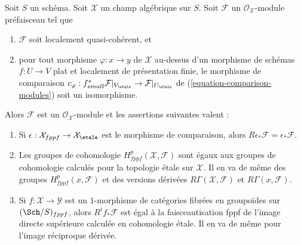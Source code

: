 \begin{lemma}
\label{lemma-compare-fppf-etale}
Soit $S$ un schéma. Soit $\mathcal{X}$ un champ algébrique sur $S$.
Soit $\mathcal{F}$ un $\mathcal{O}_\mathcal{X}$-module préfaisceau tel que
\begin{enumerate}
\item[(a)] $\mathcal{F}$ soit localement quasi-cohérent, et
\item[(b)] pour tout morphisme $\varphi : x \to y$ de $\mathcal{X}$ au-dessus
d'un morphisme de schémas $f : U \to V$ plat et
localement de présentation finie, le morphisme de comparaison
$c_\varphi : f_{small}^*\mathcal{F}|_{V_\etale} \to
\mathcal{F}|_{U_\etale}$ de
(\ref{equation-comparison-modules}) soit un isomorphisme.
\end{enumerate}
Alors $\mathcal{F}$ est un $\mathcal{O}_\mathcal{X}$-module et
les assertions suivantes valent :
\begin{enumerate}
\item Si $\epsilon : \mathcal{X}_{fppf} \to \mathcal{X}_\etale$
est le morphisme de comparaison, alors
$R\epsilon_*\mathcal{F} = \epsilon_*\mathcal{F}$.
\item Les groupes de cohomologie $H^p_{fppf}(\mathcal{X}, \mathcal{F})$ sont égaux
aux groupes de cohomologie calculés pour la topologie étale sur $\mathcal{X}$.
Il en va de même des groupes $H^p_{fppf}(x, \mathcal{F})$ et des
versions dérivées $R\Gamma(\mathcal{X}, \mathcal{F})$ et
$R\Gamma(x, \mathcal{F})$.
\item Si $f : \mathcal{X} \to \mathcal{Y}$ est un $1$-morphisme de
catégories fibrées en groupoïdes sur $(\Sch/S)_{fppf}$, alors
$R^if_*\mathcal{F}$ est égal à la faisceautisation fppf de l'image
directe supérieure calculée en cohomologie étale.
Il en va de même pour l'image réciproque dérivée.
\end{enumerate}
\end{lemma}

